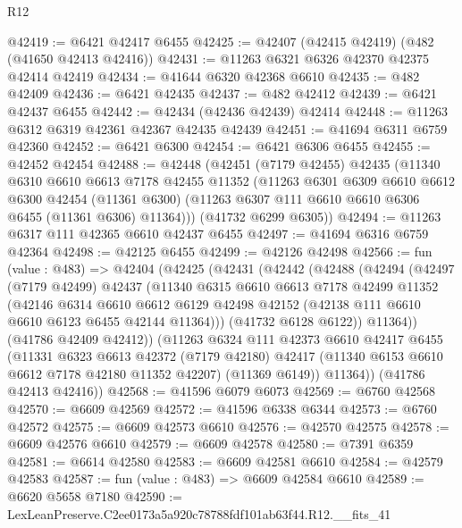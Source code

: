 \begin{lexlean}{R12}
\begin{coremodule}
@42419 := @6421 @42417 @6455
@42425 := @42407 (@42415 @42419) (@482 (@41650 @42413 @42416))
@42431 := @11263 @6321 @6326 @42370 @42375 @42414 @42419
@42434 := @41644 @6320 @42368 @6610
@42435 := @482 @42409
@42436 := @6421 @42435
@42437 := @482 @42412
@42439 := @6421 @42437 @6455
@42442 := @42434 (@42436 @42439) @42414
@42448 := @11263 @6312 @6319 @42361 @42367 @42435 @42439
@42451 := @41694 @6311 @6759 @42360
@42452 := @6421 @6300
@42454 := @6421 @6306 @6455
@42455 := @42452 @42454
@42488 := @42448
    (@42451
      (@7179 @42455)
      @42435
      (@11340
        @6310
        @6610
        @6613
        @7178
        @42455
        @11352
        (@11263
          @6301
          @6309
          @6610
          @6612
          @6300
          @42454
          (@11361 @6300)
          (@11263 @6307 @111 @6610 @6610 @6306 @6455 (@11361 @6306) @11364)))
      (@41732 @6299 @6305))
@42494 := @11263 @6317 @111 @42365 @6610 @42437 @6455
@42497 := @41694 @6316 @6759 @42364
@42498 := @42125 @6455
@42499 := @42126 @42498
@42566 := fun (value : @483) =>
  @42404
    (@42425
      (@42431
        (@42442
          (@42488
            (@42494
              (@42497
                (@7179 @42499)
                @42437
                (@11340
                  @6315
                  @6610
                  @6613
                  @7178
                  @42499
                  @11352
                  (@42146
                    @6314
                    @6610
                    @6612
                    @6129
                    @42498
                    @42152
                    (@42138 @111 @6610 @6610 @6123 @6455 @42144 @11364)))
                (@41732 @6128 @6122))
              @11364))
          (@41786 @42409 @42412))
        (@11263
          @6324
          @111
          @42373
          @6610
          @42417
          @6455
          (@11331
            @6323
            @6613
            @42372
            (@7179 @42180)
            @42417
            (@11340 @6153 @6610 @6612 @7178 @42180 @11352 @42207)
            (@11369 @6149))
          @11364))
      (@41786 @42413 @42416))
@42568 := @41596 @6079 @6073
@42569 := @6760 @42568
@42570 := @6609 @42569
@42572 := @41596 @6338 @6344
@42573 := @6760 @42572
@42575 := @6609 @42573 @6610
@42576 := @42570 @42575
@42578 := @6609 @42576 @6610
@42579 := @6609 @42578
@42580 := @7391 @6359
@42581 := @6614 @42580
@42583 := @6609 @42581 @6610
@42584 := @42579 @42583
@42587 := fun (value : @483) => @6609 @42584 @6610
@42589 := @6620 @5658 @7180
@42590 := LexLeanPreserve.C2ee0173a5a920c78788fdf101ab63f44.R12.__fits_41

\end{coremodule}
\end{lexlean}
